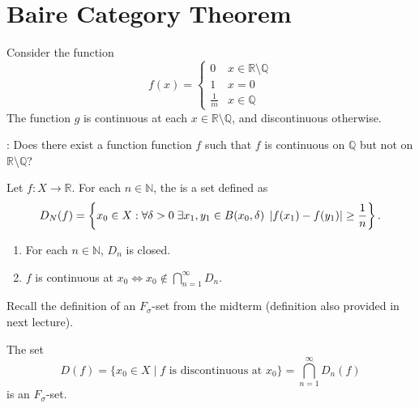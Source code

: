 \documentclass[notoc,notitlepage]{tufte-book}
\begin{document}

\section{Baire Category Theorem}%
\label{sec:baire_category_theorem}

\begin{eg}
  Consider the function
  \begin{equation*}
    f(x) = \begin{cases}
      0           & x \in \mathbb{R} \setminus \mathbb{Q}\\
      1           & x = 0 \\
      \frac{1}{m} & x \in \mathbb{Q}
    \end{cases}
  \end{equation*}
  The function $g$ is continuous at each $x \in \mathbb{R} \setminus \mathbb{Q}$, and discontinuous otherwise.
\end{eg}

: Does there exist a function function $f$ such that $f$ is continuous on $\mathbb{Q}$ but not on $\mathbb{R} \setminus \mathbb{Q}$? 

\begin{defn}\label{defn:points_of_discontinuity}
  Let $f : X \to \mathbb{R}$. For each $n \in \mathbb{N}$, the  is a set defined as
  \begin{equation*}
    D_N(f) = \left\{ x_0 \in X : \forall \delta > 0 \; \exists x_1, y_1 \in B(x_0, \delta) \; \left| f(x_1) - f(y_1) \right| \geq \frac{1}{n} \right\}.
  \end{equation*}
\end{defn}

\begin{note}
  \begin{enumerate}
    \item For each $n \in \mathbb{N}$, $D_n$ is closed.
    \item $f$ is continuous at $x_0 \iff x_0 \notin \bigcap_{n = 1}^{\infty} D_n$.
  \end{enumerate}
\end{note}

\begin{remark}
  Recall the definition of an $F_\sigma$-set from the midterm (definition also provided in next lecture).

  The set
  \begin{equation*}
    D(f) = \{ x_0 \in X \mid f \text{ is discontinuous at } x_0 \} = \bigcap_{n = 1}^{\infty} D_n(f)
  \end{equation*}
  is an $F_\sigma$-set.
\end{remark}
\end{document}

